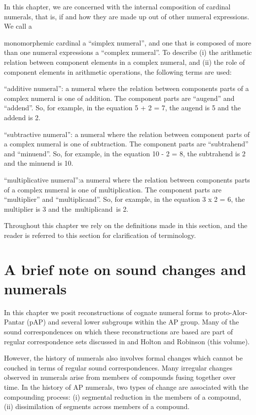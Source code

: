 In this chapter, we are concerned with the internal composition of cardinal numerals, that is, if and how they are made up out of other numeral expressions. We call a

monomorphemic cardinal a ``simplex numeral'', and one that is composed of more than one numeral expressions a ``complex numeral''. To describe (i) the arithmetic relation between component elements in a complex numeral, and (ii) the role of component elements in arithmetic operations, the following terms are used:

``additive numeral'': a numeral where the relation between components parts of a complex numeral is one of addition. The component parts are ``augend'' and ``addend''.  So, for example, in the equation 5 + 2 = 7, the augend is 5 and the addend is 2.

``subtractive numeral'': a numeral where the relation between component parts of a complex numeral is one of subtraction. The component parts are ``subtrahend'' and ``minuend''. So, for example, in the equation 10 - 2 = 8, the subtrahend is 2 and the minuend is 10.

``multiplicative numeral'':a numeral where the relation between components parts of a complex numeral is one of multiplication. The component parts are ``multiplier'' and ``multiplicand''.  So, for example, in the equation 3 x 2 = 6, the multiplier is 3 and the~multiplicand~is 2.

Throughout this chapter we rely on the definitions made in this section, and the reader is referred to this section for clarification of terminology.

\section{A brief note on sound changes and numerals}
In this chapter we posit reconstructions of cognate numeral forms to proto-Alor-Pantar (pAP) and several lower subgroups within the AP group. Many of the sound correspondences on which these reconstructions are based are part of regular correspondence sets discussed in \citet{HoltonEtAl2012} and Holton and Robinson (this volume).

  However, the history of numerals also involves formal changes which cannot be couched in terms of regular sound correspondences. Many irregular changes observed in numerals arise from members of compounds fusing together over time. In the history of AP numerals, two  types of change are associated with the compounding process: (i) segmental reduction in the members of a compound, (ii) dissimilation of segments across members of a compound.


